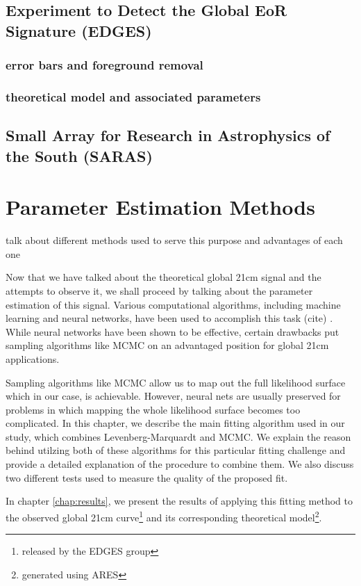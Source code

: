 \documentclass[12pt, TexShade, letterpaper]{report}
\begin{document}
\section{Experiment to Detect the Global EoR Signature (EDGES)}
\subsection{error bars and foreground removal}
\subsection{theoretical model and associated parameters}
\section{Small Array for Research in Astrophysics of the South (SARAS)}
\chapter{Parameter Estimation Methods}
\label{chap:method}
talk about different methods used to serve this purpose and advantages of each one\par
Now that we have talked about the theoretical global 21cm signal and the attempts to observe it, we shall proceed by talking about the parameter estimation of this signal. Various computational algorithms, including machine learning and neural networks, have been used to accomplish this task (cite) . While neural networks have been shown to be effective, certain drawbacks  put sampling algorithms like MCMC on an advantaged position for global 21cm applications.\par
Sampling algorithms like MCMC allow us to map out the full likelihood surface which in our case, is achievable. However, neural nets are usually preserved for problems in which mapping the whole likelihood surface  becomes too complicated.
In this chapter, we describe the main fitting algorithm used in our study, which combines Levenberg-Marquardt and MCMC. We explain the reason behind utilzing both of these algorithms for this particular fitting challenge and provide a detailed explanation of the procedure to combine them. We also discuss two different tests used to measure the quality of the proposed fit.\par
In chapter \ref{chap:results}, we present the results of applying this fitting method to the observed global 21cm curve\footnote{released by the EDGES group} and its corresponding theoretical model\footnote{generated using ARES}.
\end{document}
